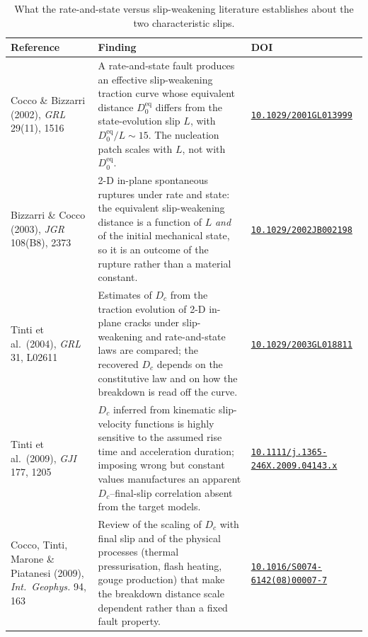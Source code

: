 \documentclass[11pt]{article}
\newcommand{\doi}[1]{\href{https://doi.org/#1}{\scriptsize\texttt{#1}}}
\begin{document}
\begin{table}[htbp]
  \centering
  \footnotesize
  \caption{What the rate-and-state versus slip-weakening literature establishes
  about the two characteristic slips.}
  \label{tab:dc-literature}
  \setlength{\tabcolsep}{4pt}
  \begin{tabular}{@{}L{3.2cm} L{8.9cm} L{4.9cm}@{}}
    \toprule
    Reference & Finding & DOI \\
    \midrule
    Cocco \& Bizzarri (2002), \emph{GRL} 29(11), 1516
      & A rate-and-state fault produces an effective slip-weakening traction
        curve whose equivalent distance $D_0^{\mathrm{eq}}$ differs from the
        state-evolution slip $L$, with $D_0^{\mathrm{eq}}/L \sim 15$. The
        nucleation patch scales with $L$, not with $D_0^{\mathrm{eq}}$.
      & \doi{10.1029/2001GL013999} \\
    \addlinespace
    Bizzarri \& Cocco (2003), \emph{JGR} 108(B8), 2373
      & 2-D in-plane spontaneous ruptures under rate and state: the equivalent
        slip-weakening distance is a function of $L$ \emph{and} of the initial
        mechanical state, so it is an outcome of the rupture rather than a
        material constant.
      & \doi{10.1029/2002JB002198} \\
    \addlinespace
    Tinti et al.\ (2004), \emph{GRL} 31, L02611
      & Estimates of $D_c$ from the traction evolution of 2-D in-plane cracks
        under slip-weakening and rate-and-state laws are compared; the recovered
        $D_c$ depends on the constitutive law and on how the breakdown is read
        off the curve.
      & \doi{10.1029/2003GL018811} \\
    \addlinespace
    Tinti et al.\ (2009), \emph{GJI} 177, 1205
      & $D_c$ inferred from kinematic slip-velocity functions is highly
        sensitive to the assumed rise time and acceleration duration; imposing
        wrong but constant values manufactures an apparent $D_c$--final-slip
        correlation absent from the target models.
      & \doi{10.1111/j.1365-246X.2009.04143.x} \\
    \addlinespace
    Cocco, Tinti, Marone \& Piatanesi (2009), \emph{Int.\ Geophys.} 94, 163
      & Review of the scaling of $D_c$ with final slip and of the physical
        processes (thermal pressurisation, flash heating, gouge production)
        that make the breakdown distance scale dependent rather than a fixed
        fault property.
      & \doi{10.1016/S0074-6142(08)00007-7} \\
    \bottomrule
  \end{tabular}
\end{table}
\end{document}
